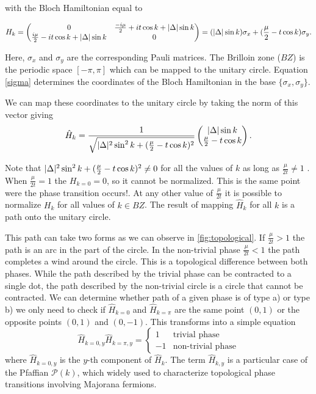 \noindent with the Bloch Hamiltonian equal to 

\begin{equation}
H_k = \begin{pmatrix} 
      0    &  \frac{-i \mu}{2} + it \cos k + \vert \Delta \vert  \sin k  \\ 
       \frac{i \mu}{2} - it \cos k + \vert \Delta \vert \sin k  &  0 
    \end{pmatrix}
    = (\vert \Delta \vert \sin k) \sigma_x + (\frac{\mu}{2}- t \cos k) \sigma_y.
\label{sigma}
\end{equation}




\noindent Here, $\sigma_x$ and $\sigma_y$ are the corresponding Pauli matrices. The Brilloin zone ($BZ$) is the periodic space  $[-\pi , \pi]$ which can be mapped to the unitary circle.   Equation \eqref{sigma} determines  the coordinates of the Bloch Hamiltonian in the base $\{\sigma_x, \sigma_y\}$. 

We can map these coordinates to the unitary circle by taking the norm of this vector giving
\begin{equation}
     \hat{H}_k= \frac{1}{\sqrt{\vert \Delta \vert^2 \sin^2 k + (\frac{\mu}{2}- t \cos k)^2}}
     \begin{pmatrix} 
      \vert \Delta \vert \sin k    \\ 
      \frac{\mu}{2}- t \cos k 
    \end{pmatrix}. 
\end{equation}

\noindent Note that $\vert \Delta \vert^2 \sin^2 k + (\frac{\mu}{2}- t \cos k)^2 \neq 0$ for all the values of $k$ as long as $\frac{\mu}{2t} \neq 1$ . When $\frac{\mu}{2t} = 1$ the $H_{k=0}=0$, so it cannot be normalized. This is the same point were the phase transition occurs!. At any other value of $\frac{\mu}{2t}$ it is possible to normalize $H_{k}$ for all values of $k\in BZ$. The result of mapping $\hat{H}_k$ for all $k$ is a path onto the unitary circle. 

This path can take two forms as we can observe in \ref{fig:topological}. If $\frac{\mu}{2t} > 1$ the path is an arc in the part of the circle. In the non-trivial phase $\frac{\mu}{2t} < 1$ the path completes a wind around the circle. This is a topological difference between both phases. While the path described by the trivial phase can be contracted to a single dot, the path described by the non-trivial circle is a circle that cannot be contracted. We can determine whether path of a given phase is of type a) or type b) we only need to check if $\hat{H}_{k=0}$ and $\hat{H}_{k=\pi}$ are the same point $(0,1)$ or the opposite points $(0,1)$ and $(0,-1)$. This transforms into a simple equation 
\begin{equation}
    \hat{H}_{k=0,y}\hat{H}_{k=\pi,y}=\begin{cases}
1 & \mbox{trivial phase}\\
-1 & \mbox{non-trivial phase}
\end{cases}
\end{equation}
\noindent where $\hat{H}_{k=0,y}$ is the $y$-th component of $\hat{H}_{k}$. The term $\hat{H}_{k,y}$ is a particular case of the Pfaffian $\mathcal{P}(k)$, which widely used to characterize topological phase transitions involving  Majorana fermions.


